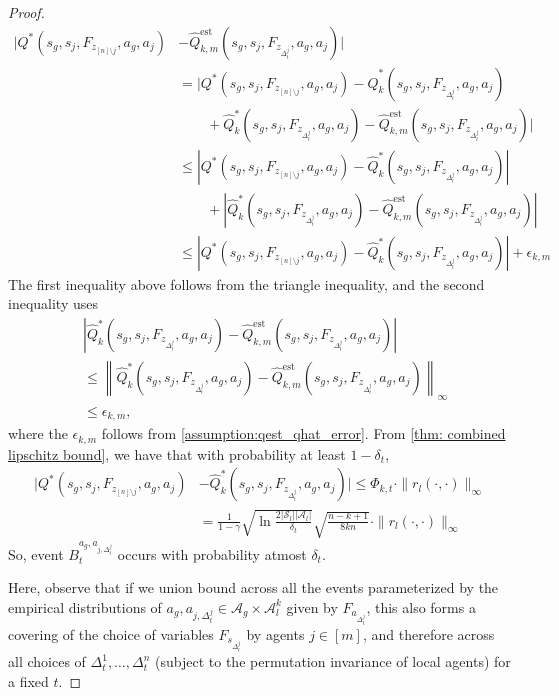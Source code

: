 \documentclass{article}
\theoremstyle{plain}
\theoremstyle{definition}
\def\est{\mathrm{est}}
\begin{document}
\begin{proof}
\begin{align*}
    |{Q}^*(s_g, s_j, F_{z_{[n]\setminus j}}, a_g, a_j) &- \hat{Q}_{k,m}^{\est}(s_g, s_j, F_{z_{\Delta_t^j}}, a_g, a_j)| \\
    &= \bigg|{Q}^*(s_g, s_j, F_{z_{[n]\setminus j}}, a_g, a_j) - \hat{Q}_k^*(s_g, s_{j},F_{z_{\Delta_t^j}}, a_g, a_j) \\
    &\quad\quad + \hat{Q}_k^*(s_g, s_{j},F_{z_{\Delta_t^j}}, a_g, a_j) - \hat{Q}_{k,m}^{\est}(s_g, s_{j},F_{z_{\Delta_t^j}}, a_g, a_j) \bigg| \\
    &\leq \left|{Q}^*(s_g, s_j, F_{z_{[n]\setminus j}}, a_g, a_j) - \hat{Q}_k^*(s_g, s_{j},F_{z_{\Delta_t^j}}, a_g, a_j)\right|  \\
    & \quad\quad +\left| \hat{Q}_k^*(s_g, s_{j},F_{z_{\Delta_t^j}}, a_g, a_j) - \hat{Q}_{k,m}^{\est}(s_g, s_{j},F_{z_{\Delta_t^j}}, a_g, a_j) \right| \\
    &\leq \left|{Q}^*(s_g, s_j, F_{z_{[n]\setminus j}} , a_g, a_j) - \hat{Q}_k^*(s_g, s_j, F_{z_{\Delta_t^j}}, a_g,a_{j})\right| + \epsilon_{k,m}
\end{align*}
The first inequality above follows from the triangle inequality, and the second inequality uses
\begin{align*}&\left| \hat{Q}_k^*(s_g, s_{j},F_{z_{\Delta_t^j}}, a_g, a_j) - \hat{Q}_{k,m}^{\est}(s_g, s_{j},F_{z_{\Delta_t^j}}, a_g, a_j) \right| \\ &\leq \left\| \hat{Q}_k^*(s_g, s_{j},F_{z_{\Delta_t^j}}, a_g, a_j) - \hat{Q}_{k,m}^{\est}(s_g, s_{j},F_{z_{\Delta_t^j}}, a_g, a_j) \right\|_\infty \\
&\leq \epsilon_{k,m},\end{align*}
where the $\epsilon_{k,m}$ follows from \cref{assumption:qest_qhat_error}. From \cref{thm: combined lipschitz bound}, we have that with probability at least $1-\delta_{t}$, 
\begin{align*}\bigg|{Q}^*(s_g, s_j, F_{z_{[n]\setminus j}}, a_g, a_j) &- \hat{Q}_k^*(s_g, s_{j},F_{z_{\Delta_t^j}}, a_g, a_{j})\bigg| \leq \Phi_{k,t} \cdot\|r_l(\cdot,\cdot)\|_\infty \\
&= \frac{1}{1-\gamma} \sqrt{\ln\frac{2|\mathcal{S}_l||\mathcal{A}_l|}{\delta_t}}\sqrt{\frac{n-k+1}{8kn}}\cdot\|r_l(\cdot,\cdot)\|_\infty\end{align*}
So, event $B_t^{a_g,a_{j,\Delta_t^j}}$ occurs with probability atmost $\delta_t$.

Here, observe that if we union bound across all the events parameterized by the empirical distributions of $a_g, a_{j,\Delta_t^j} \in \mathcal{A}_g \times \mathcal{A}_l^k$ given by $F_{a_{\Delta_t^j}}$, this also forms a covering of the choice of variables $F_{s_{\Delta_t^j}}$ by agents $j\in[m]$, and therefore across all choices of $\Delta_t^1,\dots,\Delta_t^n$ (subject to the permutation invariance of local agents) for a fixed $t$. 


\end{proof}
\end{document}

